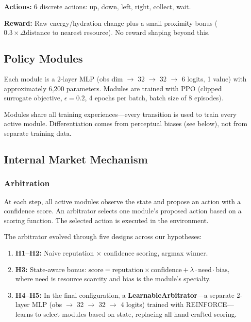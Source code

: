 \documentclass[a4paper,11pt]{article}
\begin{document}
\textbf{Actions:} 6 discrete actions: up, down, left, right, collect, wait.

\textbf{Reward:} Raw energy/hydration change plus a small proximity bonus ($0.3\times\Delta\text{distance}$ to nearest resource). No reward shaping beyond this.

\subsection{Policy Modules}

Each module is a 2-layer MLP (obs dim $\rightarrow$ 32 $\rightarrow$ 32 $\rightarrow$ 6 logits, 1 value) with approximately 6,200 parameters. Modules are trained with PPO (clipped surrogate objective, $\epsilon=0.2$, 4 epochs per batch, batch size of 8 episodes).

Modules share all training experiences---every transition is used to train every active module. Differentiation comes from perceptual biases (see below), not from separate training data.

\subsection{Internal Market Mechanism}

\subsubsection{Arbitration}

At each step, all active modules observe the state and propose an action with a confidence score. An arbitrator selects one module's proposed action based on a scoring function. The selected action is executed in the environment.

The arbitrator evolved through five designs across our hypotheses:
\begin{enumerate}[itemsep=2pt]
    \item \textbf{H1--H2:} Naive reputation $\times$ confidence scoring, argmax winner.
    \item \textbf{H3:} State-aware bonus: $\text{score} = \text{reputation} \times \text{confidence} + \lambda \cdot \text{need} \cdot \text{bias}$, where $\text{need}$ is resource scarcity and $\text{bias}$ is the module's specialty.
    \item \textbf{H4--H5:} In the final configuration, a \textbf{LearnableArbitrator}---a separate 2-layer MLP (obs $\rightarrow$ 32 $\rightarrow$ 32 $\rightarrow$ 4 logits) trained with REINFORCE---learns to select modules based on state, replacing all hand-crafted scoring.
\end{enumerate}
\end{document}
